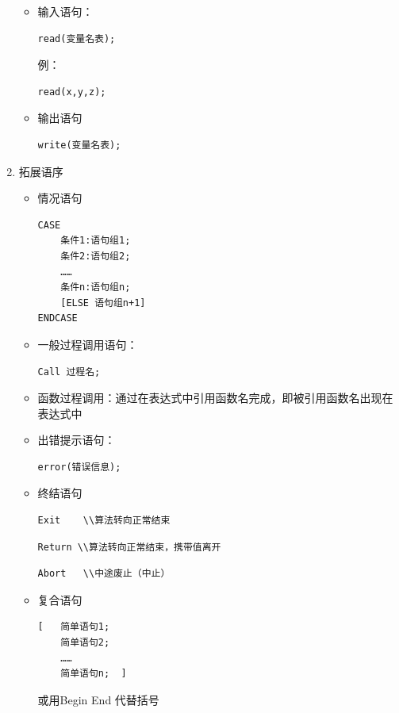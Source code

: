 \documentclass[AutoFakeBold]{LZUThesis2007}
\begin{document}
\begin{enumerate}
\begin{itemize}
\begin{itemize}
							\end{itemize}
						\item 输入语句：
\begin{lstlisting}
read(变量名表);
\end{lstlisting}
例：
\begin{lstlisting}
read(x,y,z);
\end{lstlisting}
						\item 输出语句
\begin{lstlisting}
write(变量名表);
\end{lstlisting}
					\end{itemize}
				\item 拓展语序
\begin{itemize}
	\item 情况语句
\begin{lstlisting}
CASE
	条件1:语句组1;
	条件2:语句组2;
	……
	条件n:语句组n;
	[ELSE 语句组n+1]
ENDCASE
\end{lstlisting}
	\item 一般过程调用语句：
\begin{lstlisting}
Call 过程名;
\end{lstlisting}
	\item 函数过程调用：通过在表达式中引用函数名完成，即被引用函数名出现在表达式中
	\item 出错提示语句：
\begin{lstlisting}
error(错误信息);
\end{lstlisting}
	\item 终结语句
\begin{lstlisting}
Exit 	\\算法转向正常结束
\end{lstlisting}
\begin{lstlisting}
Return \\算法转向正常结束，携带值离开
\end{lstlisting}
\begin{lstlisting}
Abort 	\\中途废止（中止）
\end{lstlisting}
	\item 复合语句
\begin{lstlisting}
[ 	简单语句1;
	简单语句2;
	……
	简单语句n;	]
\end{lstlisting}
或用Begin End 代替括号


\end{itemize}
\end{enumerate}
\end{document}
